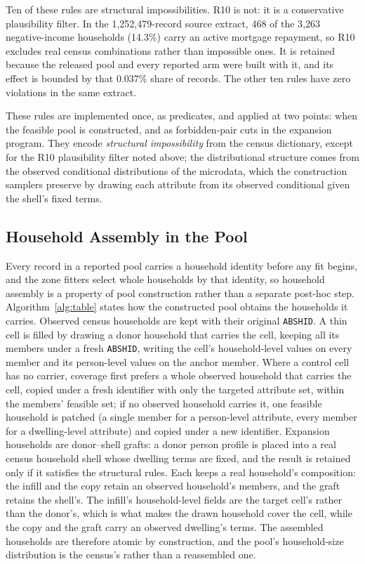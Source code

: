\documentclass[review]{elsarticle}
\begin{document}
Ten of these rules are structural impossibilities. R10 is not: it is a
conservative plausibility filter. In the 1{,}252{,}479-record source extract,
468 of the 3{,}263 negative-income households (14.3\%) carry an active mortgage
repayment, so R10 excludes real census combinations rather than impossible
ones. It is retained because the released pool and every reported arm were
built with it, and its effect is bounded by that 0.037\% share of records. The
other ten rules have zero violations in the same extract.

These rules are implemented once, as predicates, and applied at two points: when the feasible pool is constructed, and as forbidden-pair cuts in the expansion program. They encode \emph{structural impossibility} from the census dictionary, except for the R10 plausibility filter noted above; the distributional structure comes from the observed conditional distributions of the microdata, which the construction samplers preserve by drawing each attribute from its observed conditional given the shell's fixed terms.

\subsection{Household Assembly in the Pool}
\label{sec:household_appendix}
Every record in a reported pool carries a household identity before any fit
begins, and the zone fitters select whole households by that identity, so
household assembly is a property of pool construction rather than a separate
post-hoc step. Algorithm~\ref{alg:table} states how the constructed pool
obtains the households it carries. Observed census households are kept with their
original \texttt{ABSHID}. A thin cell is filled by drawing a donor household that
carries the cell, keeping all its members under a fresh \texttt{ABSHID}, writing
the cell's household-level values on every member and its person-level values on
the anchor member. Where a control cell has no carrier, coverage first
prefers a whole observed household that carries the cell, copied under a fresh
identifier with only the targeted attribute set, within the members' feasible
set; if no observed household carries it, one feasible household is patched (a
single member for a person-level attribute, every member for a dwelling-level
attribute) and copied under a new identifier. Expansion households are
donor--shell grafts: a donor person profile is placed into a real census
household shell whose dwelling terms are fixed, and the result is retained only
if it satisfies the structural rules. Each keeps a real household's composition: the infill and the copy retain an
observed household's members, and the graft retains the shell's. The infill's
household-level fields are the target cell's rather than the donor's, which is
what makes the drawn household cover the cell, while the copy and the graft
carry an observed dwelling's terms. The assembled households are therefore
atomic by construction, and the pool's household-size distribution is the
census's rather than a reassembled one.
\end{document}
